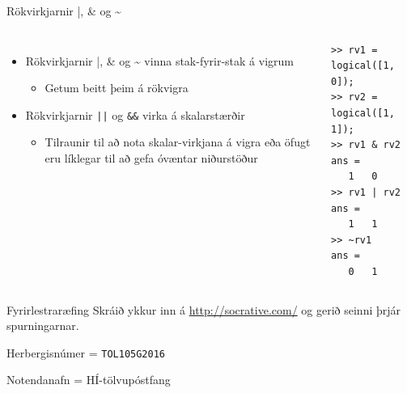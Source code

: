 \documentclass{beamer}
\begin{document}
\begin{frame}[fragile]{Rökvirkjarnir |, \& og \~{}}
\vspace{\baselineskip}
\begin{columns}
\begin{itemize}
 \item Rökvirkjarnir |, \& og \~{} vinna stak-fyrir-stak á vigrum
 \begin{itemize}
  \item Getum beitt þeim á rökvigra
 \end{itemize}
 \item Rökvirkjarnir \texttt{||} og \texttt{\&\&} virka á skalarstærðir
 \begin{itemize}
  \item Tilraunir til að nota skalar-virkjana á vigra eða öfugt eru líklegar til að gefa óvæntar niðurstöður
 \end{itemize}
\end{itemize}
\begin{verbatim}
>> rv1 = logical([1, 0]);
>> rv2 = logical([1, 1]);
>> rv1 & rv2
ans =
   1   0
>> rv1 | rv2
ans =
   1   1
>> ~rv1
ans =
   0   1
\end{verbatim}
\end{columns}
\end{frame}

\begin{frame}{Fyrirlestraræfing}
Skráið ykkur inn á \url{http://socrative.com/} og gerið seinni þrjár spurningarnar.

Herbergisnúmer = \texttt{TOL105G2016}

Notendanafn = HÍ-tölvupóstfang
\end{frame}
\end{document}
